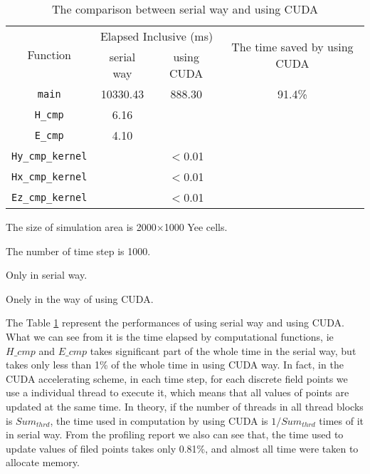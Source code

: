\begin{table}[hp]
	\centering
	\begin{threeparttable}
		\caption{The comparison between serial way and using CUDA}\label{ch4: cuda or not}
		\begin{tabular}{cccc}
			\toprule
			\multirow{2}{2em}{Function}&\multicolumn{2}{c}{Elapsed Inclusive (ms)} & \multirow{2}{14em}{The time saved by using CUDA}\\
			\cline{2-3}
			& serial way & using CUDA & \\ 
			
			\midrule
			\lstinline|main| & 10330.43 & 888.30 & 91.4\% \\
			\lstinline|H_cmp|\tnote{3} & 6.16 &  & \\ 
			\lstinline|E_cmp|\tnote{3} & 4.10 &  & \\
			\lstinline|Hy_cmp_kernel|\tnote{4} &  & $<$0.01 & \\ 
			\lstinline|Hx_cmp_kernel|\tnote{4} &  & $<$0.01 & \\ 
			\lstinline|Ez_cmp_kernel|\tnote{4} &  & $<$0.01 & \\
			\bottomrule
		\end{tabular} 
		\begin{tablenotes}
			\item[1] The size of simulation area is 2000$\times$1000 Yee cells.
			\item[2] The number of time step is 1000.
			\item[3] Only in serial way.
			\item[4] Onely in the way of using CUDA.
		\end{tablenotes}
	\end{threeparttable}
\end{table}

The Table \ref{ch4: cuda or not} represent the performances of using serial way and using CUDA. What we can see from it is the time elapsed by computational functions, ie $H\_cmp$ and $E\_cmp$ takes significant part of the whole time in the serial way, but takes only less than 1\% of the whole time in using CUDA way. In fact, in the CUDA accelerating scheme, in each time step, for each discrete field points we use a individual thread to execute it, which means that all values of points are updated at the same time. In theory, if the number of threads in all thread blocks is $Sum_{thrd}$, the time used in computation by using CUDA is $1/Sum_{thrd}$ times of it in serial way. From the profiling report we also can see that, the time used to update values of filed points takes only 0.81\%, and almost all time were taken to allocate memory.

